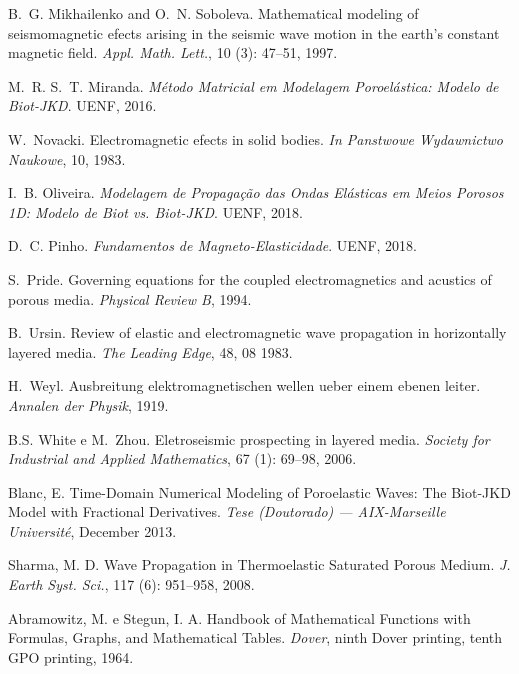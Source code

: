 \documentclass[12pt,a4paper,oneside]{abntex2}
\begin{document}
\begin{thebibliography}{25}
B.~G. Mikhailenko and O.~N. Soboleva.
\newblock Mathematical modeling of seismomagnetic efects arising in the seismic
  wave motion in the earth's constant magnetic field.
\newblock \emph{Appl. Math. Lett.}, 10 (3): 47--51, 1997.

M.~R. S.~T. Miranda.
\newblock \emph{M\'etodo Matricial em Modelagem Poroel\'astica: Modelo de
  Biot-JKD}.
\newblock UENF, 2016.

W.~Novacki.
\newblock Electromagnetic efects in solid bodies.
\newblock \emph{In Panstwowe Wydawnictwo Naukowe}, 10, 1983.

I.~B. Oliveira.
\newblock \emph{Modelagem de Propaga\c{c}\~ao das Ondas El\'asticas em Meios
  Porosos 1D: Modelo de Biot vs. Biot-JKD}.
\newblock UENF, 2018.

D.~C. Pinho.
\newblock \emph{Fundamentos de Magneto-Elasticidade}.
\newblock UENF, 2018.

S.~Pride.
\newblock Governing equations for the coupled electromagnetics and acustics of
  porous media.
\newblock \emph{Physical Review B}, 1994.

B.~Ursin.
\newblock Review of elastic and electromagnetic wave propagation in
  horizontally layered media.
\newblock \emph{The Leading Edge}, 48, 08 1983.

H.~Weyl.
\newblock Ausbreitung elektromagnetischen wellen ueber einem ebenen leiter.
\newblock \emph{Annalen der Physik}, 1919.

B.S. White e M.~Zhou.
\newblock Eletroseismic prospecting in layered media.
\newblock \emph{Society for Industrial and Applied Mathematics}, 67
  (1): 69--98, 2006.

Blanc, E.
\newblock Time-Domain Numerical Modeling of Poroelastic Waves: The Biot-JKD
Model with Fractional Derivatives.
\newblock \emph{Tese (Doutorado) — AIX-Marseille Université}, December 2013.

Sharma, M. D.
\newblock Wave Propagation in Thermoelastic Saturated Porous Medium.
\newblock \emph{J. Earth Syst. Sci.}, 117
  (6): 951--958, 2008.
  
Abramowitz, M. e Stegun, I. A.
\newblock Handbook of Mathematical Functions with Formulas, Graphs, and Mathematical Tables.
\newblock \emph{Dover}, ninth Dover printing, tenth GPO printing, 1964.  
    

\end{thebibliography}
\end{document}
